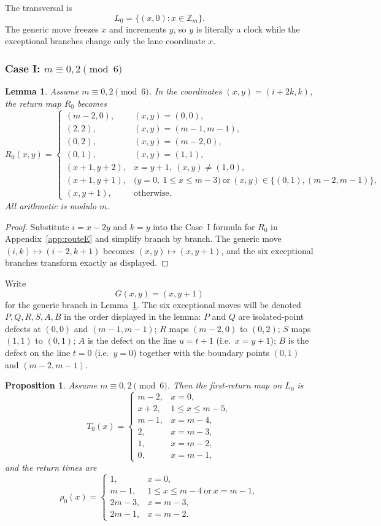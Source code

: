 \documentclass[11pt]{article}
\newtheorem{lemma}{Lemma}
\newtheorem{proposition}{Proposition}
\newcommand{\Zm}{\mathbb Z_m}
\begin{document}
The transversal is
\[
L_0=\{(x,0):x\in \Zm\}.
\]
The generic move freezes $x$ and increments $y$, so $y$ is literally a clock while the exceptional branches change only the lane coordinate $x$.

\subsubsection{Case I: $m\equiv 0,2\pmod 6$}

\begin{lemma}\label{lem:R0-caseI-xy}
Assume $m\equiv 0,2\pmod 6$.
In the coordinates $(x,y)=(i+2k,k)$, the return map $R_0$ becomes
\[
R_0(x,y)=
\begin{cases}
(m-2,0),&(x,y)=(0,0),\\
(2,2),&(x,y)=(m-1,m-1),\\
(0,2),&(x,y)=(m-2,0),\\
(0,1),&(x,y)=(1,1),\\
(x+1,y+2),&x=y+1,\ (x,y)\neq (1,0),\\
(x+1,y+1),&\bigl(y=0,\ 1\le x\le m-3\bigr)\ \text{or}\ (x,y)\in\{(0,1),(m-2,m-1)\},\\
(x,y+1),&\text{otherwise}.
\end{cases}
\]
All arithmetic is modulo $m$.
\end{lemma}

\begin{proof}
Substitute $i=x-2y$ and $k=y$ into the Case~I formula for $R_0$ in Appendix~\ref{app:routeE} and simplify branch by
branch.
The generic move $(i,k)\mapsto(i-2,k+1)$ becomes $(x,y)\mapsto(x,y+1)$, and the six exceptional
branches transform exactly as displayed.
\end{proof}

Write
\[
G(x,y)=(x,y+1)
\]
for the generic branch in Lemma~\ref{lem:R0-caseI-xy}.
The six exceptional moves will be denoted $P,Q,R,S,A,B$ in the order displayed in the lemma:
$P$ and $Q$ are isolated-point defects at $(0,0)$ and $(m-1,m-1)$;
$R$ maps $(m-2,0)$ to $(0,2)$;
$S$ maps $(1,1)$ to $(0,1)$;
$A$ is the defect on the line $u=t+1$ (i.e.\ $x=y+1$);
$B$ is the defect on the line $t=0$ (i.e.\ $y=0$) together with the boundary points $(0,1)$ and $(m-2,m-1)$.

\begin{proposition}\label{prop:R0-caseI-data}
Assume $m\equiv 0,2\pmod 6$.
Then the first-return map on $L_0$ is
\[
T_0(x)=
\begin{cases}
m-2,&x=0,\\
x+2,&1\le x\le m-5,\\
m-1,&x=m-4,\\
2,&x=m-3,\\
1,&x=m-2,\\
0,&x=m-1,
\end{cases}
\]
and the return times are
\[
\rho_0(x)=
\begin{cases}
1,&x=0,\\
m-1,&1\le x\le m-4\ \text{or}\ x=m-1,\\
2m-3,&x=m-3,\\
2m-1,&x=m-2.
\end{cases}
\]
\end{proposition}
\end{document}

